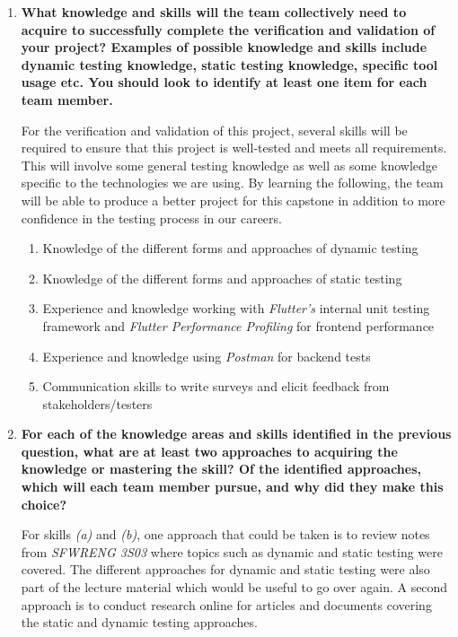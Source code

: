 \documentclass[12pt, titlepage]{article}
\begin{document}
\begin{enumerate}
  \item \textbf{What knowledge and skills will the team collectively need to acquire to
  successfully complete the verification and validation of your project?
  Examples of possible knowledge and skills include dynamic testing knowledge,
  static testing knowledge, specific tool usage etc.  You should look to
  identify at least one item for each team member.}

  For the verification and validation of this project, several skills will be required
  to ensure that this project is well-tested and meets all requirements. This will involve
  some general testing knowledge as well as some knowledge specific to the technologies we
  are using. By learning the following, the team will be able to produce a better project for this
  capstone in addition to more confidence in the testing process in our careers.
  \begin{enumerate}
    \item Knowledge of the different forms and approaches of dynamic testing
    \item Knowledge of the different forms and approaches of static testing
    \item Experience and knowledge working with \textit{Flutter's} internal unit testing framework and
    \textit{Flutter Performance Profiling} for frontend performance
    \item Experience and knowledge using \textit{Postman} for backend tests
    \item Communication skills to write surveys and elicit feedback from stakeholders/testers
  \end{enumerate}

  \item \textbf{For each of the knowledge areas and skills identified in the previous
  question, what are at least two approaches to acquiring the knowledge or
  mastering the skill?  Of the identified approaches, which will each team
  member pursue, and why did they make this choice?}

  For skills \textit{(a)} and \textit{(b)}, one approach that could be taken is to review notes from
  \textit{SFWRENG 3S03} where topics such as dynamic and static testing were covered. The different
  approaches for dynamic and static testing were also part of the lecture material which would be useful to go over again.
  A second approach is to conduct research online for articles and documents covering the static and dynamic testing approaches. \par


\end{enumerate}
\end{document}
